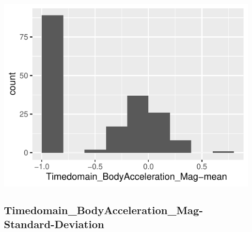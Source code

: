 \documentclass[
]{article}
\begin{document}
\begin{minipage}{0.25 \textwidth}

\includegraphics{codebook_tidydatasub_files/figure-latex/Var-33-Timedomain-BodyAcceleration-Mag-mean--1.pdf}

\end{minipage}

\noindent\makebox[\linewidth]{\rule{\textwidth}{0.4pt}}

\hypertarget{timedomain_bodyacceleration_mag-standard-deviation}{%
\subsection{Timedomain\_BodyAcceleration\_Mag-Standard-Deviation}\label{timedomain_bodyacceleration_mag-standard-deviation}}
\end{document}

